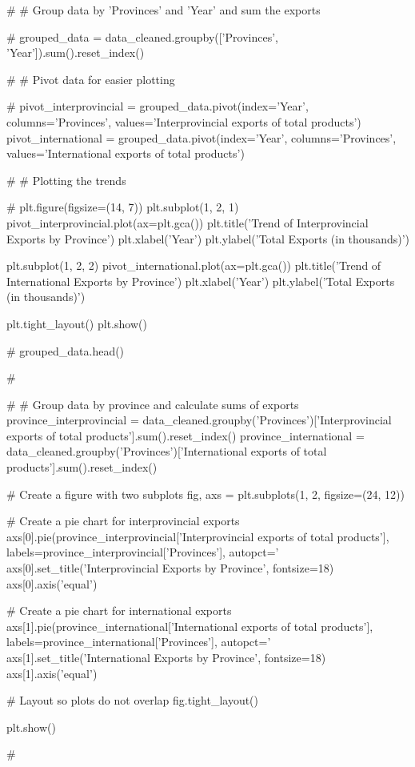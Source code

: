 # %
# Group data by 'Provinces' and 'Year' and sum the exports

# %
grouped_data = data_cleaned.groupby(['Provinces', 'Year']).sum().reset_index()


# %
# Pivot data for easier plotting

# %
pivot_interprovincial = grouped_data.pivot(index='Year', columns='Provinces', values='Interprovincial exports of total products')
pivot_international = grouped_data.pivot(index='Year', columns='Provinces', values='International exports of total products')

# %
# Plotting the trends

# %
plt.figure(figsize=(14, 7))
plt.subplot(1, 2, 1)
pivot_interprovincial.plot(ax=plt.gca())
plt.title('Trend of Interprovincial Exports by Province')
plt.xlabel('Year')
plt.ylabel('Total Exports (in thousands)')

plt.subplot(1, 2, 2)
pivot_international.plot(ax=plt.gca())
plt.title('Trend of International Exports by Province')
plt.xlabel('Year')
plt.ylabel('Total Exports (in thousands)')

plt.tight_layout()
plt.show()

# %
grouped_data.head()

# %


# %
# Group data by province and calculate sums of exports
province_interprovincial = data_cleaned.groupby('Provinces')['Interprovincial exports of total products'].sum().reset_index()
province_international = data_cleaned.groupby('Provinces')['International exports of total products'].sum().reset_index()

# Create a figure with two subplots
fig, axs = plt.subplots(1, 2, figsize=(24, 12))

# Create a pie chart for interprovincial exports
axs[0].pie(province_interprovincial['Interprovincial exports of total products'], labels=province_interprovincial['Provinces'], autopct='%
axs[0].set_title('Interprovincial Exports by Province', fontsize=18)
axs[0].axis('equal')

# Create a pie chart for international exports
axs[1].pie(province_international['International exports of total products'], labels=province_international['Provinces'], autopct='%
axs[1].set_title('International Exports by Province', fontsize=18)
axs[1].axis('equal')

# Layout so plots do not overlap
fig.tight_layout()

plt.show()

# %



